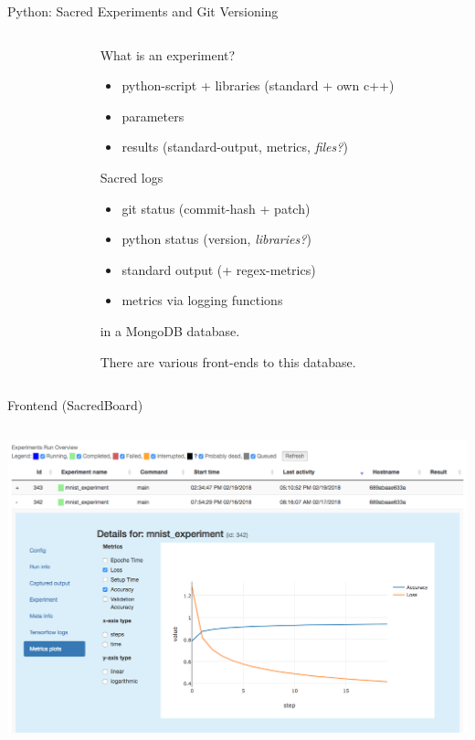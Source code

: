 \documentclass[aspectratio=169,10pt]{beamer}
\begin{document}
\begin{frame}[t,fragile]{Python: Sacred Experiments and Git Versioning}
\begin{columns}
\begin{column}{.05\paperwidth}
\end{column}
\begin{column}{.55\paperwidth}
    What is an \alert{experiment}?
    \begin{itemize}
        \item python-script + libraries (standard + own c++)
        \item parameters
        \item results (standard-output, metrics, \emph{files?})
    \end{itemize}
    \pause
    Sacred logs
    \begin{itemize}
        \item git status (commit-hash + patch)
        \item python status (version, \emph{libraries?})
        \item standard output (+ regex-metrics)
        \item metrics via logging functions
    \end{itemize}
    in a MongoDB database. 

    There are various \alert{front-ends} to this database.
    \vspace{1cm}
\end{column}
\end{columns}
\end{frame}

\begin{frame}[t]{Frontend (SacredBoard)}
\vspace{-1.45mm}
\begin{columns}[t]
\begin{column}{\paperwidth}
    \hspace{.125\paperwidth}
    \includegraphics[keepaspectratio,width=.75\paperwidth]{board}          
\end{column}
    \end{columns}
\end{frame}
\end{document}
